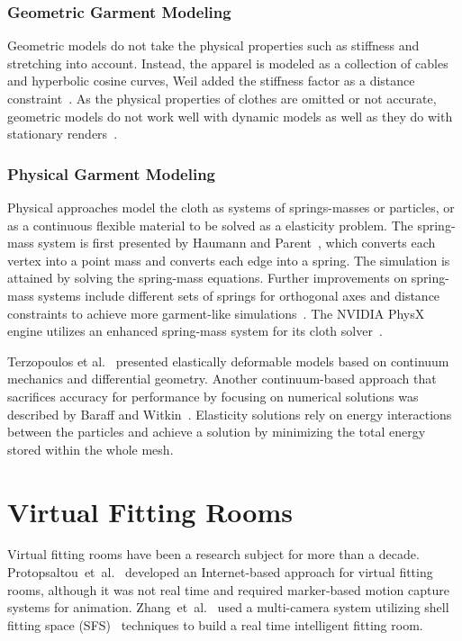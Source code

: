 \subsubsection{Geometric Garment Modeling}
Geometric models do not take the physical properties such as stiffness and stretching into account. Instead, the apparel is modeled as a collection of cables and hyperbolic cosine curves, Weil added the stiffness factor as a distance constraint~\cite{Weil1986}. As the physical properties of clothes are omitted or not accurate, geometric models do not work well with dynamic models as well as they do with stationary renders~\cite{Weil1986}.

\subsubsection{Physical Garment Modeling}
Physical approaches model the cloth as systems of springs-masses or particles, or as a continuous flexible material to be solved as a elasticity problem. The spring-mass system is first presented by Haumann and Parent~\cite{Haumann1988}, which converts each vertex into a point mass and converts each edge into a spring. The simulation is attained by solving the spring-mass equations. Further improvements on spring-mass systems include different sets of springs for orthogonal axes and distance constraints to achieve more garment-like simulations~\cite{Provot1996}. The NVIDIA PhysX engine utilizes an enhanced spring-mass system for its cloth solver~\cite{Kim2011}.

Terzopoulos et al.~\cite{Terzopoulos1987} presented elastically deformable models based on continuum mechanics and differential geometry. Another continuum-based approach that sacrifices accuracy for performance by focusing on numerical solutions was described by Baraff and Witkin~\cite{Baraff1998}. Elasticity solutions rely on energy interactions between the particles and achieve a solution by minimizing the total energy stored within the whole mesh.

\section{Virtual Fitting Rooms}
\label{section_related_virtual_fitting}

Virtual fitting rooms have been a research subject for more than a decade. Protopsaltou~et~al.~\cite{Protopsaltou2002} developed an Inter\-net-based approach for virtual fitting rooms, although it was not real time and required marker-based motion capture systems for animation. Zhang~et~al.~\cite{Zhang2008} used a multi-camera system utilizing shell fitting space (SFS)~\cite{Cheung2005} techniques to build a real time intelligent fitting room.

